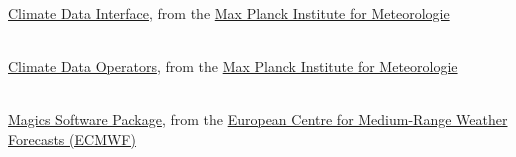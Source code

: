 \begin{thebibliography}{xx}


 \ \\
  \href{https://code.mpimet.mpg.de/projects/cdi}
       {Climate Data Interface},
  from the
  \href{http://www.mpimet.mpg.de}
       {Max Planck Institute for Meteorologie}


 \ \\
  \href{https://code.mpimet.mpg.de/projects/cdo}
       {Climate Data Operators},
  from the
  \href{http://www.mpimet.mpg.de}
       {Max Planck Institute for Meteorologie}


 \ \\
  \href{https://software.ecmwf.int/wiki/display/MAGP/Magics}
       {Magics Software Package},
  from the
  \href{https://www.ecmwf.int}
       {European Centre for Medium-Range Weather Forecasts (ECMWF)}


\end{thebibliography}
